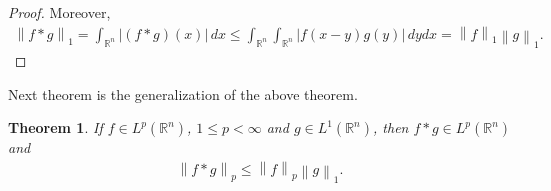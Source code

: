 \documentclass[11pt]{book}
\newtheorem{theorem}{Theorem}[chapter]
\theoremstyle{definition}
\numberwithin{equation}{chapter}
\begin{document}
\begin{proof}
Moreover,
\begin{align*}
    \left\|f*g\right\|_1 = \int_{\mathbb{R}^n} \left|(f*g)(x)\right|\,dx \leq \int_{\mathbb{R}^n} \int_{\mathbb{R}^n} \left|f(x-y)g(y)\right| \,dydx = \left\|f\right\|_1 \left\|g\right\|_1.
\end{align*}
\end{proof}

\medskip

Next theorem is the generalization of the above theorem.

\medskip

\begin{theorem}
If $f\in L^p(\mathbb{R}^n)$, $1 \leq p < \infty$ and $g \in L^1(\mathbb{R}^n)$, then $f*g \in L^p(\mathbb{R}^n)$ and
\begin{align*}
    \left\|f*g\right\|_p \leq \left\|f\right\|_p \left\|g\right\|_1.
\end{align*}
\end{theorem}
\end{document}
